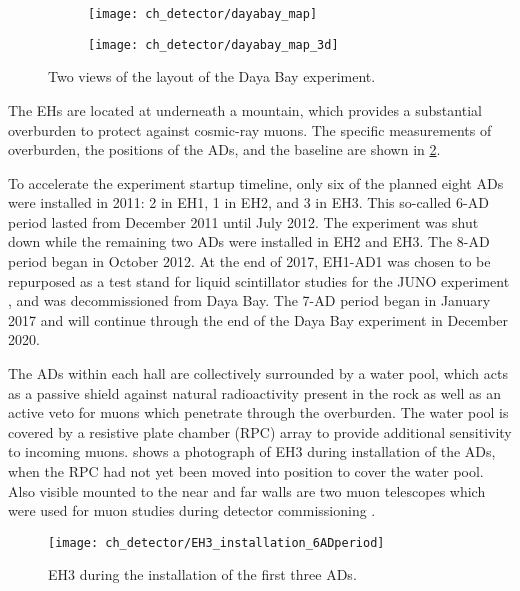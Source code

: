 \begin{figure}
    \centering
    \begin{subfigure}{0.49\textwidth}
        \texttt{[image: ch\_detector/dayabay\_map]}
    \end{subfigure}
    \begin{subfigure}{0.49\textwidth}
        \texttt{[image: ch\_detector/dayabay\_map\_3d]}
    \end{subfigure}
    \caption{Two views of the layout of the Daya Bay experiment.}
    \label{fig:layout}
\end{figure}

The EHs are located at underneath a mountain, which provides a substantial
overburden to protect against cosmic-ray muons.
The specific measurements of overburden, the positions of the ADs,
and the baseline are shown in \cref{tab:baselines}.

\begin{figure}
    \label{tab:baselines}
\end{figure}

To accelerate the experiment startup timeline,
only six of the planned eight ADs were installed in 2011:
2 in EH1, 1 in EH2, and 3 in EH3.
This so-called 6-AD period lasted from December 2011 until July 2012.
The experiment was shut down while the remaining two ADs were installed
in EH2 and EH3.
The 8-AD period began in October 2012.
At the end of 2017, EH1-AD1 was chosen to be repurposed as a test stand
for liquid scintillator studies for the JUNO experiment \cite{junoproposal2016},
and was decommissioned from Daya Bay.
The 7-AD period began in January 2017 and will continue through the end of
the Daya Bay experiment in December 2020.

The ADs within each hall are collectively surrounded by a water pool,
which acts as a passive shield against natural radioactivity present in the rock
as well as an active veto for muons which penetrate through the overburden.
The water pool is covered by a resistive plate chamber (RPC) array
to provide additional sensitivity to incoming muons.
 shows a photograph of EH3 during installation of the ADs,
when the RPC had not yet been moved into position to cover the water pool.
Also visible mounted to the near and far walls are two muon telescopes
which were used for muon studies during detector commissioning \cite{muonsystem2015}.

\begin{figure}
    \centering
    \texttt{[image: ch\_detector/EH3\_installation\_6ADperiod]}
    \caption{EH3 during the installation of the first three ADs.}
    \label{fig:eh3_wp_photo}
\end{figure}

